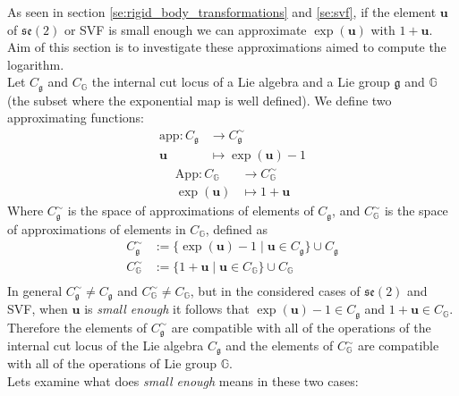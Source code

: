 \noindent
As seen in section \ref{se:rigid_body_transformations} and \ref{se:svf}, if the element $\mathbf{u}$ of $\mathfrak{se}(2)$ or SVF is small enough we can approximate $\exp(\mathbf{u})$ with $1 + \mathbf{u}$. Aim of this section is to investigate these approximations aimed to compute the logarithm.  \\
Let $C_\mathfrak{g}$ and $C_\mathbb{G}$ the internal cut locus of a Lie algebra and a Lie group $\mathfrak{g}$ and $\mathbb{G}$ (the subset where the exponential map is well defined).
We define two approximating functions:
\begin{align*}
\text{app} : C_\mathfrak{g} & \longrightarrow  C_\mathfrak{g}^{\sim}    \\
\mathbf{u} &\longmapsto \exp(\mathbf{u}) - 1
\end{align*}
\begin{align*}
\text{App} : C_\mathbb{G} & \longrightarrow  C_\mathbb{G}^{\sim}   \\
\exp(\mathbf{u}) &\longmapsto 1 + \mathbf{u}
\end{align*}
Where $C_\mathfrak{g} ^{\sim}$ is the space of approximations of elements of $C_\mathfrak{g} $, and $C_\mathbb{G}^{\sim} $ is the space of approximations of elements in $C_\mathbb{G}$, defined as
\begin{align*}
C_\mathfrak{g} ^{\sim} & := \{ \exp(\mathbf{u}) - 1 \mid \mathbf{u}\in C_\mathfrak{g}\} \cup C_\mathfrak{g} \\
C_\mathbb{G}^{\sim}  & := \{ 1 + \mathbf{u} \mid \mathbf{u}\in C_\mathbb{G}\} \cup C_\mathbb{G} \\
\end{align*}
In general $C_\mathfrak{g}^{\sim} \neq C_\mathfrak{g}$ and $C_\mathbb{G}^{\sim} \neq C_\mathbb{G}$, but in the considered cases of $\mathfrak{se}(2)$ and SVF, when $\mathbf{u}$ is \emph{small enough}
it follows that $\exp(\mathbf{u}) - 1 \in C_\mathfrak{g} $ and $1 + \mathbf{u}\in C_\mathbb{G}$. Therefore the elements of $C_\mathfrak{g}^{\sim} $ are compatible with all of the operations of the internal cut locus of the Lie algebra $C_\mathfrak{g}$ and the elements of $C_\mathbb{G}^{\sim}$ are compatible with all of the operations of Lie group $\mathbb{G}$.\\
Lets examine what does \emph{small enough} means in these two cases:
